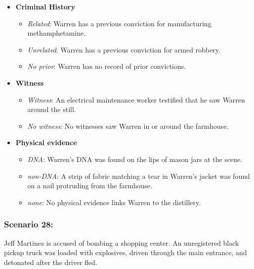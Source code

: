 \documentclass[
]{article}
\providecommand{\tightlist}{%
  \setlength{\itemsep}{0pt}\setlength{\parskip}{0pt}}
\begin{document}
\begin{itemize}
\tightlist
\item
  \textbf{Criminal History}

  \begin{itemize}
  \tightlist
  \item
    \emph{Related}: Warren has a previous conviction for manufacturing
    methamphetamine.
  \item
    \emph{Unrelated}: Warren has a previous conviction for armed
    robbery.
  \item
    \emph{No prior}: Warren has no record of prior convictions.
  \end{itemize}
\item
  \textbf{Witness}

  \begin{itemize}
  \tightlist
  \item
    \emph{Witness}: An electrical maintenance worker testified that he
    saw Warren around the still.
  \item
    \emph{No witness}: No witnesses saw Warren in or around the
    farmhouse.
  \end{itemize}
\item
  \textbf{Physical evidence}

  \begin{itemize}
  \tightlist
  \item
    \emph{DNA}: Warren's DNA was found on the lips of mason jars at the
    scene.
  \item
    \emph{non-DNA}: A strip of fabric matching a tear in Warren's jacket
    was found on a nail protruding from the farmhouse.
  \item
    \emph{none}: No physical evidence links Warren to the distillery.
  \end{itemize}
\end{itemize}

\hypertarget{scenario-28}{%
\subsubsection{Scenario 28:}\label{scenario-28}}

Jeff Martinez is accused of bombing a shopping center. An unregistered
black pickup truck was loaded with explosives, driven through the main
entrance, and detonated after the driver fled.
\end{document}
